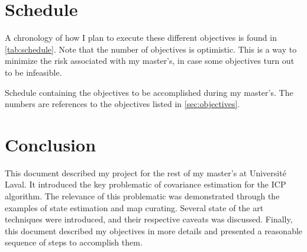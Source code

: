 \documentclass[10pt,letterpaper,oneside]{article}
\begin{document}
\section{Schedule}

A chronology of how I plan to execute these different objectives is found in \autoref{tab:schedule}.
Note that the number of objectives is optimistic.
This is a way to minimize the risk associated with my master's, in case some objectives turn out to be infeasible.

\begin{table}[htbp]
  \centering
  \caption{Schedule containing the objectives to be accomplished during my master's.
  The numbers are references to the objectives listed in \autoref{sec:objectives}.}
  
  \label{tab:schedule}
\end{table}

\section{Conclusion}

This document described my project for the rest of my master's at Université Laval.
It introduced the key problematic of covariance estimation for the \ac{ICP} algorithm.
The relevance of this problematic was demonstrated through the examples of state estimation and map curating.
Several state of the art techniques were introduced, and their respective caveats was discussed.
Finally, this document described my objectives in more details and presented a reasonable sequence of steps to accomplish them.

\printbibliography
\end{document}
